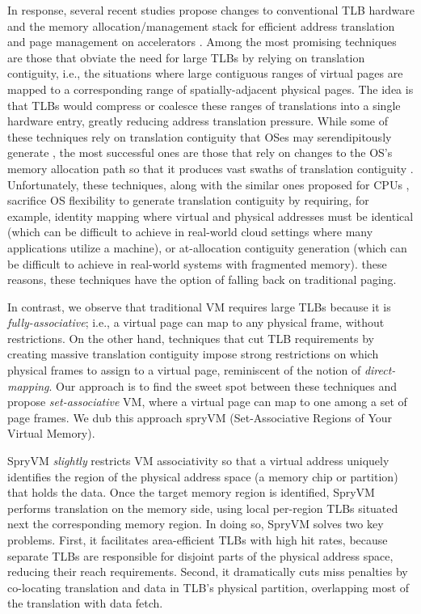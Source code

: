 In response, several recent studies propose changes to conventional
TLB hardware and the memory allocation/management stack for efficient
address translation and page management on accelerators
\cite{pichai:architectural, power:supporting,
  ausavarungnirun:mosaic}. Among the most promising techniques are those
that obviate the need for large TLBs by relying on 
translation contiguity, i.e., the situations where large contiguous 
ranges of virtual pages are mapped to a corresponding range
of spatially-adjacent physical pages. The idea is that TLBs would
compress or coalesce these ranges of translations into a single
hardware entry, greatly reducing address translation pressure. While
some of these techniques rely on translation contiguity that OSes may
serendipitously generate \cite{pham:colt, bhattacharjee:large-reach, 
cox:efficient, pham:increasing}, the most successful ones are those that
rely on changes to the OS's memory allocation path so that it produces
vast swaths of translation contiguity
\cite{haria:devirtualizing}. Unfortunately, these techniques, along with
the similar ones proposed for CPUs \cite{basu:efficient, gandhi:range},
sacrifice OS flexibility to generate translation contiguity by
requiring, for example, identity mapping where virtual and physical 
addresses must be identical (which can be difficult to
achieve in real-world cloud settings where many applications utilize a
machine), or at-allocation contiguity generation (which can be difficult
to achieve in real-world systems with fragmented memory). %
these reasons, these techniques have the option of falling back on
traditional paging.

In contrast, we observe that traditional VM requires large
TLBs because it is {\it fully-associative}; i.e., a virtual page can
map to any physical frame, without restrictions. On the other hand, techniques that cut TLB
requirements by creating massive translation contiguity
\cite{basu:efficient, gandhi:range, haria:devirtualizing} impose
strong restrictions on which physical frames to assign to a virtual
page, reminiscent of the notion of {\it direct-mapping}. Our approach
is to find the sweet spot between these techniques and propose {\it
  set-associative} VM, where a virtual page can map to one among a set
of page frames. We dub this approach spryVM (Set-Associative Regions
of Your Virtual Memory). 

SpryVM {\it slightly} restricts VM associativity so that a virtual address uniquely
identifies the region of the physical address space (a memory chip or  partition)
that holds the data. Once the target memory region is identified, SpryVM performs 
translation on the memory side, using local per-region TLBs situated next the corresponding memory region. 
In doing so, SpryVM solves two key problems. First, it facilitates area-efficient 
TLBs with high hit rates, because separate TLBs are responsible for disjoint 
parts of the physical address space, reducing their reach requirements. Second, 
it dramatically cuts miss penalties by co-locating translation and data in TLB's 
physical partition, overlapping most of the translation with data fetch.


